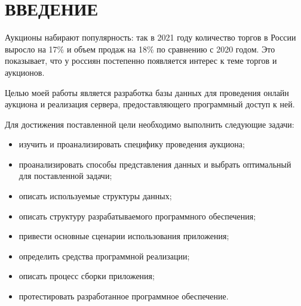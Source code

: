 \chapter*{ВВЕДЕНИЕ}



Аукционы набирают популярность: так в 2021 году количество торгов в России выросло на 17\% и объем продаж на 18\% по сравнению с 2020 годом\cite{artauctionstat2021}. Это показывает, что у россиян постепенно появляется интерес к теме торгов и аукционов.

Целью моей работы является разработка базы данных для проведения онлайн аукциона и реализация сервера, предоставляющего программный доступ к ней.

Для достижения поставленной цели необходимо выполнить следующие задачи:

\begin{itemize}
    \item изучить и проанализировать специфику проведения аукциона;
    \item проанализировать способы представления данных и выбрать оптимальный для поставленной задачи;
    \item описать используемые структуры данных;
    \item описать структуру разрабатываемого программного обеспечения;
    \item привести основные сценарии использования приложения;
    \item определить средства программной реализации;
    \item описать процесс сборки приложения;
    \item протестировать разработанное программное обеспечение.
\end{itemize}
